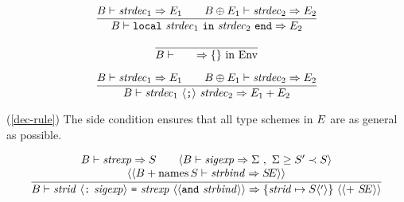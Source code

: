 \vspace{6pt}
\begin{equation}                %
\frac{ \B\ts\strdec_1\ra\E_1\qquad
       \B\oplus\E_1\ts\strdec_2\ra\E_2 }
     { \B\ts\localstrdec\ra\E_2 }
\end{equation}

\vspace{6pt}
\begin{equation}                %
\frac{}
     {\B\ts\emptystrdec\ra \emptymap{\rm\ in}\ \Env}
\end{equation}

\vspace{6pt}
\begin{equation}		%
\frac{ \B\ts\strdec_1\ra\E_1\qquad
       \B\oplus\E_1\ts\strdec_2\ra\E_2 }
     { \B\ts\seqstrdec\ra\plusmap{\E_1}{\E_2} }
\end{equation}
\comments
\begin{description}
\item{(\ref{dec-rule})}
The side condition ensures that all type schemes in $E$ are as
general as possible.
\end{description}
\begin{equation}                %
\label{structure-binding-rule}
\frac{ \begin{array}{cl}
       \B\ts\strexp\ra\S\qquad\langle\B\ts\sigexp\ra\sig\ ,
                                      \ \sig\geq\S'\prec\S\rangle\\
       \langle\langle\plusmap{\B}{\NamesFcn\S}\ts
                                      \strbind\ra\SE\rangle\rangle
       \end{array}
     }
     { \B\ts\strbinder\ra\{\strid\mapsto\S\langle'\rangle\}
       \ \langle\langle +\ \SE\rangle\rangle }\index{41.1}
\end{equation}
